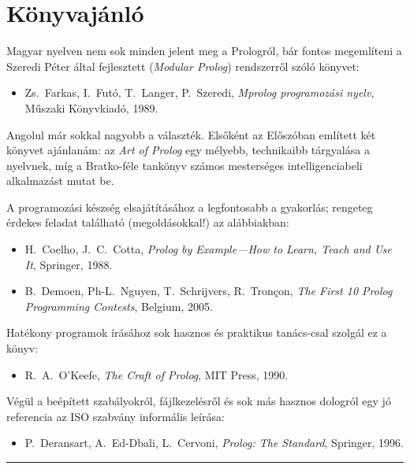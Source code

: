 \chapter{Könyvajánló}
Magyar nyelven nem sok minden jelent meg a Prologról, bár fontos
megemlíteni a Szeredi Péter által fejlesztett 
(\emph{Modular Prolog}) rendszerről szóló
könyvet:
\begin{itemize}[leftmargin=1.5cm,itemindent=-1cm,labelsep=0cm]
\item[] Zs.~Farkas, I.~Futó, T.~Langer, P.~Szeredi, \emph{Mprolog
programozási nyelv}, Műszaki Könyvkiadó, 1989.
\end{itemize}
Angolul már sokkal nagyobb a választék. Elsőként az Előszóban említett
két könyvet ajánlanám: az \emph{Art of Prolog} egy mélyebb,
technikaibb tárgyalása a nyelvnek, míg a Bratko-féle tankönyv számos
mesterséges intelligenciabeli alkalmazást mutat be.

A programozási készség elsajátításához a legfontosabb a gyakorlás;
rengeteg érdekes feladat található (megoldásokkal!) az alábbiakban:
\begin{itemize}[leftmargin=1.5cm,itemindent=-1cm,labelsep=0cm]
\item[] H.~Coelho, J.~C.~Cotta, \emph{Prolog by Example---How to Learn, Teach and Use It}, Springer, 1988.
\item[] B.~Demoen, Ph-L.~Nguyen, T.~Schrijvers, R.~Tron\c con, \emph{The First 10 Prolog Programming Contests}, Belgium, 2005.
\end{itemize}
Hatékony programok írásához sok hasznos és praktikus tanács-csal szolgál ez a könyv:
\begin{itemize}[leftmargin=1.5cm,itemindent=-1cm,labelsep=0cm]
\item[] R.~A.~O'Keefe, \emph{The Craft of Prolog}, MIT Press, 1990.
\end{itemize}
Végül a beépített szabályokról, fájlkezelésről és sok más hasznos
dologról egy jó referencia az ISO szabvány informális leírása:
\begin{itemize}[leftmargin=1.5cm,itemindent=-1cm,labelsep=0cm]
\item[] P.~Deransart, A.~Ed-Dbali, L.~Cervoni, \emph{Prolog: The Standard}, Springer, 1996.
\end{itemize}

\bigskip
\begin{center}
\rule{0.5\textwidth}{.5pt}
\end{center}
\bigskip

